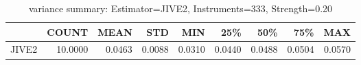\begin{table}[ht]
\centering
\caption{variance summary: Estimator=JIVE2, Instruments=333, Strength=0.20}
\begin{tabular}{lrrrrrrrr}
\toprule
 & COUNT & MEAN & STD & MIN & 25\% & 50\% & 75\% & MAX \\
\midrule
JIVE2 & 10.0000 & 0.0463 & 0.0088 & 0.0310 & 0.0440 & 0.0488 & 0.0504 & 0.0570 \\
\bottomrule
\end{tabular}
\end{table}
